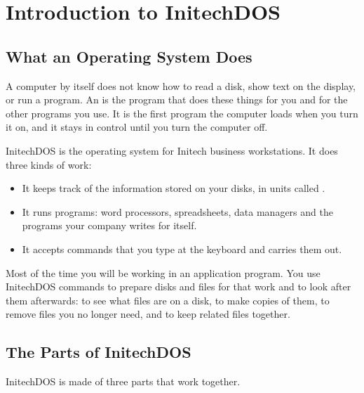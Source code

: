 \chapter{Introduction to InitechDOS}

\section{What an Operating System Does}
A computer by itself does not know how to read a disk, show text on the
display, or run a program.  An  is the program that
does these things for you and for the other programs you use.  It is the
first program the computer loads when you turn it on, and it stays in
control until you turn the computer off.

InitechDOS is the operating system for Initech business
workstations.  It does three kinds of work:
\begin{itemize}
\item It keeps track of the information stored on your disks, in units
  called .
\item It runs programs: word processors, spreadsheets, data managers and
  the programs your company writes for itself.
\item It accepts commands that you type at the keyboard and carries them
  out.
\end{itemize}
Most of the time you will be working in an application program.  You use
InitechDOS commands to prepare disks and files for that work and to look
after them afterwards: to see what files are on a disk, to make copies of
them, to remove files you no longer need, and to keep related files
together.

\section{The Parts of InitechDOS}
InitechDOS is made of three parts that work together.


